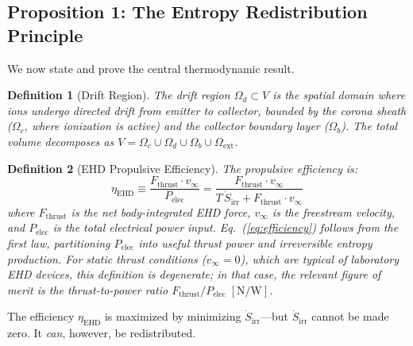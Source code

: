 \documentclass[12pt,twocolumn]{article}
\newtheorem{definition}{Definition}
\newcommand{\Sdot}{\dot{S}_{\mathrm{irr}}}
\begin{document}
\subsection{Proposition 1: The Entropy Redistribution Principle}
\label{sec:theory:theorem1}

We now state and prove the central thermodynamic result.

\begin{definition}[Drift Region]
\label{def:drift_region}
The drift region $\Omega_d \subset V$ is the spatial domain where
ions undergo directed drift from emitter to collector, bounded by
the corona sheath ($\Omega_c$, where ionization is active) and the
collector boundary layer ($\Omega_b$). The total volume decomposes
as $V = \Omega_c \cup \Omega_d \cup \Omega_b \cup \Omega_{\mathrm{ext}}$.
\end{definition}

\begin{definition}[EHD Propulsive Efficiency]
\label{def:efficiency}
The propulsive efficiency is:
\begin{equation}
  \eta_{\mathrm{EHD}}
  \equiv \frac{F_{\mathrm{thrust}} \cdot v_{\infty}}{P_{\mathrm{elec}}}
  = \frac{F_{\mathrm{thrust}} \cdot v_{\infty}}
         {T\,\Sdot + F_{\mathrm{thrust}} \cdot v_{\infty}}
  \label{eq:efficiency}
\end{equation}
where $F_{\mathrm{thrust}}$ is the net body-integrated EHD force,
$v_{\infty}$ is the freestream velocity, and $P_{\mathrm{elec}}$
is the total electrical power input. Eq.~(\ref{eq:efficiency})
follows from the first law, partitioning $P_{\mathrm{elec}}$ into
useful thrust power and irreversible entropy production. For static
thrust conditions ($v_{\infty} = 0$), which are typical of
laboratory EHD devices, this definition is degenerate; in that case,
the relevant figure of merit is the thrust-to-power ratio
$F_{\mathrm{thrust}} / P_{\mathrm{elec}}\;[\mathrm{N/W}]$.
\end{definition}

The efficiency $\eta_{\mathrm{EHD}}$ is maximized by minimizing
$\Sdot$---but $\Sdot$ cannot be made zero. It \emph{can}, however,
be redistributed.
\end{document}
